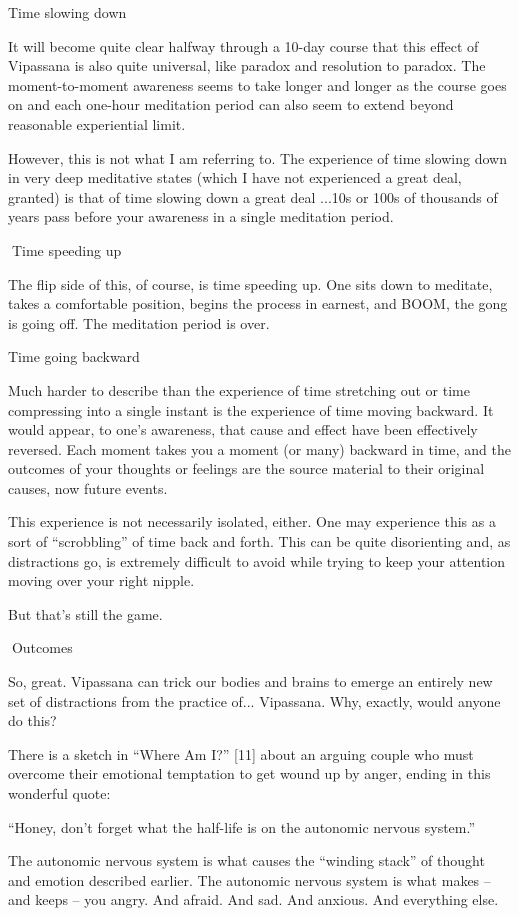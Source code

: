 \documentclass{article}
\begin{document}
Time slowing down

It will become quite clear halfway through a 10-day course that this effect of Vipassana is also quite universal, like paradox and resolution to paradox. The moment-to-moment awareness seems to take longer and longer as the course goes on and each one-hour meditation period can also seem to extend beyond reasonable experiential limit.

However, this is not what I am referring to. The experience of time slowing down in very deep meditative states (which I have not experienced a great deal, granted) is that of time slowing down a great deal ...10s or 100s of thousands of years pass before your awareness in a single meditation period.

Time speeding up

The flip side of this, of course, is time speeding up. One sits down to meditate, takes a comfortable position, begins the process in earnest, and BOOM, the gong is going off. The meditation period is over.

Time going backward

Much harder to describe than the experience of time stretching out or time compressing into a single instant is the experience of time moving backward. It would appear, to one's awareness, that cause and effect have been effectively reversed. Each moment takes you a moment (or many) backward in time, and the outcomes of your thoughts or feelings are the source material to their original causes, now future events.

This experience is not necessarily isolated, either. One may experience this as a sort of ``scrobbling'' of time back and forth. This can be quite disorienting and, as distractions go, is extremely difficult to avoid while trying to keep your attention moving over your right nipple.

But that's still the game.


Outcomes

So, great. Vipassana can trick our bodies and brains to emerge an entirely new set of distractions from the practice of... Vipassana. Why, exactly, would anyone do this?

There is a sketch in ``Where Am I?'' [11] about an arguing couple who must overcome their emotional temptation to get wound up by anger, ending in this wonderful quote:

“Honey, don’t forget what the half-life is on the autonomic nervous system.”

The autonomic nervous system is what causes the ``winding stack'' of thought and emotion described earlier. The autonomic nervous system is what makes -- and keeps -- you angry. And afraid. And sad. And anxious. And everything else.
\end{document}
